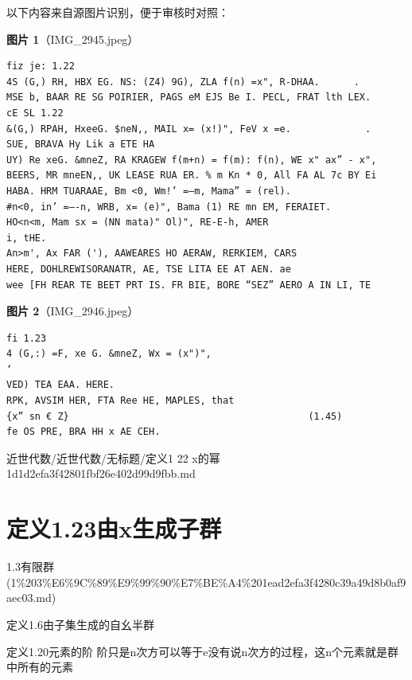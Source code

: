 \begin{note}
以下内容来自源图片识别，便于审核时对照：

\textbf{图片 1}（IMG\_2945.jpeg）
\begin{Verbatim}[fontsize=\small]
fiz je: 1.22
4S (G,) RH, HBX EG. NS: (Z4) 9G), ZLA f(n) =x", R-DHAA.      .
MSE b, BAAR RE SG POIRIER, PAGS eM EJS Be I. PECL, FRAT lth LEX.
cE SL 1.22
&(G,) RPAH, HxeeG. $neN,, MAIL x= (x!)", FeV x =e.             .
SUE, BRAVA Hy Lik a ETE HA
UY) Re xeG. &mneZ, RA KRAGEW f(m+n) = f(m): f(n), WE x" ax” - x",
BEERS, MR mneEN,, UK LEASE RUA ER. % m Kn * 0, All FA AL 7c BY Ei
HABA. HRM TUARAAE, Bm <0, Wm!’ =—m, Mama” = (rel).
#n<0, in’ =—-n, WRB, x= (e)", Bama (1) RE mn EM, FERAIET.
HO<n<m, Mam sx = (NN mata)" Ol)", RE-E-h, AMER
i, tHE.
An>m', Ax FAR ('), AAWEARES HO AERAW, RERKIEM, CARS
HERE, DOHLREWISORANATR, AE, TSE LITA EE AT AEN. ae
wee [FH REAR TE BEET PRT IS. FR BIE, BORE “SEZ” AERO A IN LI, TE
\end{Verbatim}

\textbf{图片 2}（IMG\_2946.jpeg）
\begin{Verbatim}[fontsize=\small]
fi 1.23
4 (G,:) =F, xe G. &mneZ, Wx = (x")",                                      ‘
VED) TEA EAA. HERE.
RPK, AVSIM HER, FTA Ree HE, MAPLES, that
{x” sn € Z}                                          (1.45)
fe OS PRE, BRA HH x AE CEH.
\end{Verbatim}

\end{note}

\begin{note}[来源路径]

近世代数/近世代数/无标题/定义1 22 x的幂 1d1d2efa3f42801fbf26e402d99d9fbb.md

\end{note}

\section*{定义1.23由x生成子群}

\begin{note}[来源上级主题]

1.3有限群 (1\%203\%E6\%9C\%89\%E9\%99\%90\%E7\%BE\%A4\%201ead2efa3f4280c39a49d8b0af9aec03.md)

\end{note}

\begin{definition}[定义1.23由x生成子群]

定义1.6由子集生成的自幺半群

定义1.20元素的阶 阶只是n次方可以等于e没有说n次方的过程，这n个元素就是群中所有的元素

\end{definition}

